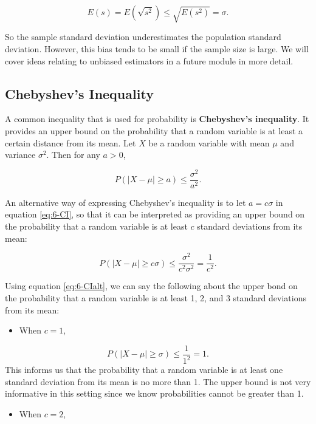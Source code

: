 \documentclass[
]{book}
\providecommand{\tightlist}{%
  \setlength{\itemsep}{0pt}\setlength{\parskip}{0pt}}
\begin{document}
\[
E(s) = E(\sqrt{s^2}) \leq \sqrt{E(s^2)} = \sigma.
\]

So the sample standard deviation underestimates the population standard deviation. However, this bias tends to be small if the sample size is large. We will cover ideas relating to unbiased estimators in a future module in more detail.

\subsection{Chebyshev's Inequality}\label{chebyshevs-inequality}

A common inequality that is used for probability is \textbf{Chebyshev's inequality}. It provides an upper bound on the probability that a random variable is at least a certain distance from its mean. Let \(X\) be a random variable with mean \(\mu\) and variance \(\sigma^2\). Then for any \(a>0\),

\begin{equation} 
P(|X-\mu| \geq a) \leq \frac{\sigma^2}{a^2}.
\label{eq:6-CI}
\end{equation}

An alternative way of expressing Chebyshev's inequality is to let \(a = c \sigma\) in equation \eqref{eq:6-CI}, so that it can be interpreted as providing an upper bound on the probability that a random variable is at least \(c\) standard deviations from its mean:

\begin{equation} 
P(|X-\mu| \geq c \sigma) \leq \frac{\sigma^2}{c^2 \sigma^2} = \frac{1}{c^2}.
\label{eq:6-CIalt}
\end{equation}

Using equation \eqref{eq:6-CIalt}, we can say the following about the upper bond on the probability that a random variable is at least 1, 2, and 3 standard deviations from its mean:

\begin{itemize}
\tightlist
\item
  When \(c=1\),
\end{itemize}

\[
P(|X-\mu| \geq \sigma) \leq \frac{1}{1^2} = 1.
\]
This informs us that the probability that a random variable is at least one standard deviation from its mean is no more than 1. The upper bound is not very informative in this setting since we know probabilities cannot be greater than 1.

\begin{itemize}
\tightlist
\item
  When \(c=2\),
\end{itemize}
\end{document}
